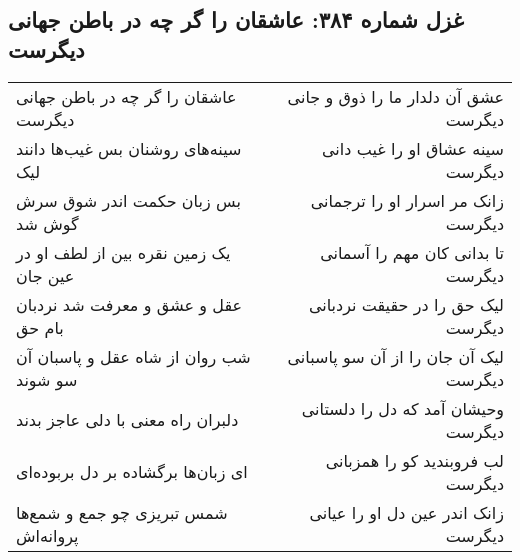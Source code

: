 \begin{center}
\section*{غزل شماره ۳۸۴: عاشقان را گر چه در باطن جهانی دیگرست}
\label{sec:0384}
\begin{longtable}{l p{0.5cm} r}
عاشقان را گر چه در باطن جهانی دیگرست
&&
عشق آن دلدار ما را ذوق و جانی دیگرست
\\
سینه‌های روشنان بس غیب‌ها دانند لیک
&&
سینه عشاق او را غیب دانی دیگرست
\\
بس زبان حکمت اندر شوق سرش گوش شد
&&
زانک مر اسرار او را ترجمانی دیگرست
\\
یک زمین نقره بین از لطف او در عین جان
&&
تا بدانی کان مهم را آسمانی دیگرست
\\
عقل و عشق و معرفت شد نردبان بام حق
&&
لیک حق را در حقیقت نردبانی دیگرست
\\
شب روان از شاه عقل و پاسبان آن سو شوند
&&
لیک آن جان را از آن سو پاسبانی دیگرست
\\
دلبران راه معنی با دلی عاجز بدند
&&
وحیشان آمد که دل را دلستانی دیگرست
\\
ای زبان‌ها برگشاده بر دل بربوده‌ای
&&
لب فروبندید کو را همزبانی دیگرست
\\
شمس تبریزی چو جمع و شمع‌ها پروانه‌اش
&&
زانک اندر عین دل او را عیانی دیگرست
\\
\end{longtable}
\end{center}
